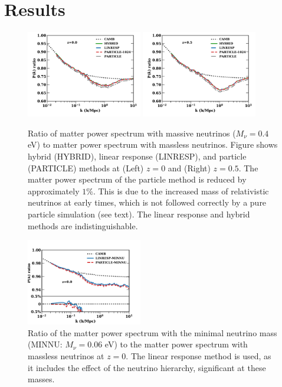 \documentclass[useAMS, usenatbib]{mnras}
\begin{document}

%

\section{Results}
\label{sec:results}

\begin{figure}
\includegraphics[width=0.45\textwidth]{nuplots/pks_rel-10.pdf}
\includegraphics[width=0.45\textwidth]{nuplots/pks_rel-0_66670.pdf}
  \caption{Ratio of matter power spectrum with massive neutrinos ($M_\nu = 0.4$ eV) to matter power spectrum with massless neutrinos. Figure shows hybrid (HYBRID), linear response (LINRESP), and particle (PARTICLE) methods at (Left) $z=0$ and (Right) $z=0.5$. The matter power spectrum of the particle method is reduced by approximately $1\%$. This is due to the increased mass of relativistic neutrinos at early times, which is not followed correctly by a pure particle simulation (see text). The linear response and hybrid methods are indistinguishable.
  }
  \label{fig:matter_power}
\end{figure}

\begin{figure}
\includegraphics[width=0.45\textwidth]{nuplots/pks_lowmass-10.pdf}
\caption{Ratio of the matter power spectrum with the minimal neutrino mass (MINNU: $M_\nu = 0.06$ eV) to the matter power spectrum with massless neutrinos at $z=0$. The linear response method is used, as it includes the effect of the neutrino hierarchy, significant at these masses.
}
\label{fig:minimal_mass}
\end{figure}
\end{document}
